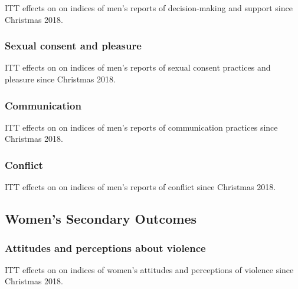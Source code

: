 \documentclass[11pt,english]{article}
\begin{document}
\begin{table}[H]
\centering

\caption{ITT effects on on indices of men's reports of decision-making and support since Christmas 2018.}
\label{tab:dm_etc_results_m}
\end{table}

\subsubsection{Sexual consent and pleasure}

\begin{table}[H]
\centering

\caption{ITT effects on on indices of men's reports of sexual consent practices and pleasure since Christmas 2018.}
\label{tab:sex_results_m}
\end{table}

\subsubsection{Communication}

\begin{table}[H]
\centering

\caption{ITT effects on on indices of men's reports of communication practices since Christmas 2018.}
\label{tab:comm_results_m}
\end{table}

\subsubsection{Conflict}

\begin{table}[H]
\centering

\caption{ITT effects on on indices of men's reports of conflict since Christmas 2018.}
\label{tab:conflict_results_m}
\end{table}

\subsection{Women's Secondary Outcomes}


\subsubsection{Attitudes and perceptions about violence}

\begin{table}[H]
\centering

\caption{ITT effects on on indices of women's attitudes and perceptions of violence since Christmas 2018.}
\label{tab:attitudes_results_w}
\end{table}
\end{document}
